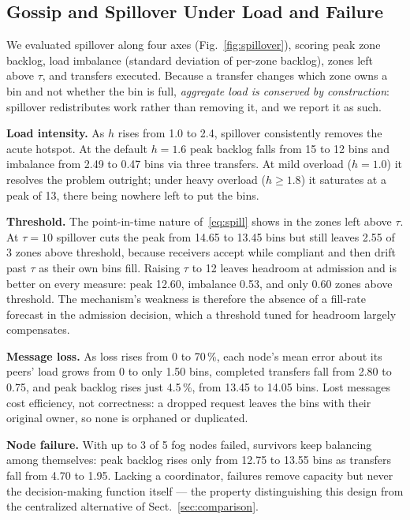 \documentclass{llncs}
\begin{document}
\subsection{Gossip and Spillover Under Load and Failure}
\label{sec:spillover}
We evaluated spillover along four axes (Fig.~\ref{fig:spillover}), scoring peak
zone backlog, load imbalance (standard deviation of per-zone backlog), zones
left above $\tau$, and transfers executed. Because a transfer changes which
zone owns a bin and not whether the bin is full, \emph{aggregate load is
conserved by construction}: spillover redistributes work rather than removing
it, and we report it as such.

\textbf{Load intensity.} As $h$ rises from 1.0 to 2.4, spillover consistently
removes the acute hotspot. At the default $h=1.6$ peak backlog falls from 15 to
12 bins and imbalance from 2.49 to 0.47 bins via three transfers. At mild
overload ($h=1.0$) it resolves the problem outright; under heavy overload
($h\geq1.8$) it saturates at a peak of 13, there being nowhere left to put the
bins.

\textbf{Threshold.} The point-in-time nature of~\eqref{eq:spill} shows in the
zones left above $\tau$. At $\tau=10$ spillover cuts the peak from 14.65 to
13.45 bins but still leaves 2.55 of 3 zones above threshold, because receivers
accept while compliant and then drift past $\tau$ as their own bins fill.
Raising $\tau$ to 12 leaves headroom at admission and is better on every
measure: peak 12.60, imbalance 0.53, and only 0.60 zones above threshold. The
mechanism's weakness is therefore the absence of a fill-rate forecast in the
admission decision, which a threshold tuned for headroom largely compensates.

\textbf{Message loss.} As loss rises from 0 to 70\,\%, each node's mean error
about its peers' load grows from 0 to only 1.50 bins, completed transfers fall
from 2.80 to 0.75, and peak backlog rises just 4.5\,\%, from 13.45 to 14.05
bins. Lost messages cost efficiency, not correctness: a dropped request leaves
the bins with their original owner, so none is orphaned or duplicated.

\textbf{Node failure.} With up to 3 of 5 fog nodes failed, survivors keep
balancing among themselves: peak backlog rises only from 12.75 to 13.55 bins as
transfers fall from 4.70 to 1.95. Lacking a coordinator, failures remove
capacity but never the decision-making function itself --- the property
distinguishing this design from the centralized alternative of
Sect.~\ref{sec:comparison}.
\end{document}
